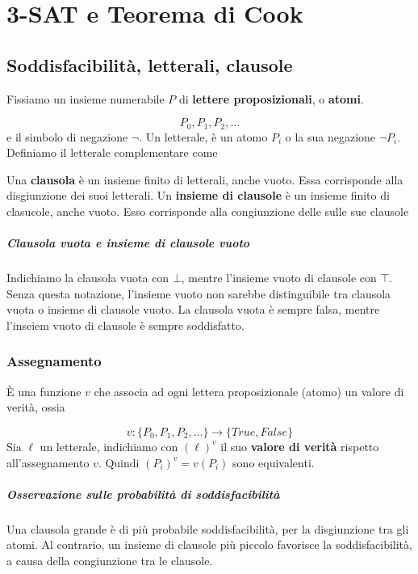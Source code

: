 \chapter{3-SAT e Teorema di Cook}

\section{Soddisfacibilità, letterali, clausole}

Fissiamo un insieme numerabile $P$ di \textbf{lettere proposizionali}, o \textbf{atomi}.

$$
P_0, P_1, P_2, \dots
$$
%
e il simbolo di negazione $\lnot$. Un letterale, è un atomo $P_i$ o la sua negazione $\lnot P_i$. Definiamo il letterale complementare come


Una \textbf{clausola} è un insieme finito di letterali, anche vuoto. Essa corrisponde alla disgiunzione dei suoi letterali.
Un \textbf{insieme di clausole} è un insieme finito di clasucole, anche vuoto. Esso corrisponde alla congiunzione delle sulle sue clausole 

\paragraph{Clausola vuota e insieme di clausole vuoto}
Indichiamo la clausola vuota con $\bot$, mentre l'insieme vuoto di clausole con $\top$. Senza questa notazione, l'insieme vuoto non sarebbe distinguibile tra clausola vuota o insieme di clausole vuoto. La clausola vuota è sempre falsa, mentre l'inseiem vuoto di clausole è sempre soddisfatto.

\subsection{Assegnamento}

È una funzione $v$ che associa ad ogni lettera proposizionale (atomo) un valore di verità, ossia

$$
v: \{P_0, P_1, P_2, \dots\} \to \{True, False\}
$$
%
Sia $\ell$ un letterale, indichiamo con $(\ell)^v$ il suo \textbf{valore di verità} rispetto all'assegnamento $v$. Quindi $(P_i)^v = v(P_i)$ sono equivalenti.

\paragraph{Osservazione sulle probabilità di soddisfacibilità} Una clausola grande è di più probabile soddisfacibilità, per la disgiunzione tra gli atomi. Al contrario, un insieme di clausole più piccolo favorisce la soddisfacibilità, a causa della congiunzione tra le clausole.



